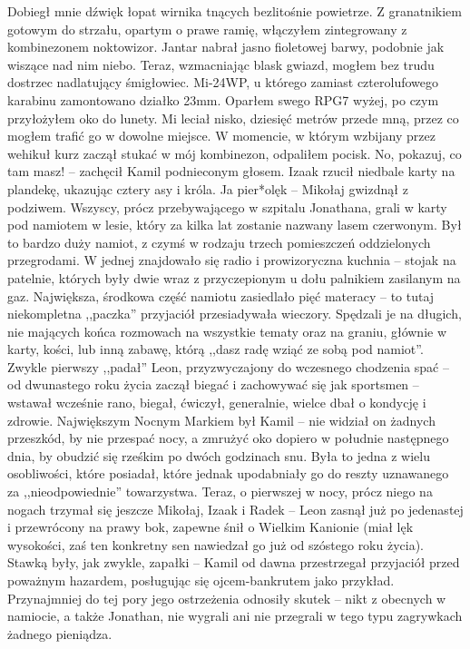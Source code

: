 \documentclass[../MAIN.tex]{subfiles}
\begin{document}
Dobiegł mnie dźwięk łopat wirnika tnących bezlitośnie powietrze. Z granatnikiem gotowym do strzału, opartym o prawe ramię, włączyłem zintegrowany z kombinezonem noktowizor. Jantar nabrał jasno fioletowej barwy, podobnie jak wiszące nad nim niebo. Teraz, wzmacniając blask gwiazd, mogłem bez trudu dostrzec nadlatujący śmigłowiec. Mi-24WP, u którego zamiast czterolufowego karabinu zamontowano działko 23mm. Oparłem swego RPG7 wyżej, po czym przyłożyłem oko do lunety. Mi leciał nisko, dziesięć metrów przede mną, przez co mogłem trafić go w dowolne miejsce. W momencie, w którym wzbijany przez wehikuł kurz zaczął stukać w mój kombinezon, odpaliłem pocisk.
% 
% 
\sx No, pokazuj, co tam masz! -- zachęcił Kamil podnieconym głosem.
\qd
Izaak rzucił niedbale karty na plandekę, ukazując cztery asy i króla.
\sx Ja pier*olę\3k -- Mikołaj gwizdnął z podziwem.
\qd
Wszyscy, prócz przebywającego w szpitalu Jonathana, grali w karty pod namiotem w lesie, który za kilka lat zostanie nazwany lasem czerwonym. Był to bardzo duży namiot, z czymś w rodzaju trzech pomieszczeń oddzielonych przegrodami. W jednej znajdowało się radio i prowizoryczna kuchnia -- stojak na patelnie, których były dwie wraz z przyczepionym u dołu palnikiem zasilanym na gaz. Największa, środkowa część namiotu zasiedlało pięć materacy -- to tutaj niekompletna ,,paczka'' przyjaciół przesiadywała wieczory. Spędzali je na długich, nie mających końca rozmowach na wszystkie tematy oraz na graniu, głównie w karty, kości, lub inną zabawę, którą ,,dasz radę wziąć ze sobą pod namiot''. Zwykle pierwszy ,,padał'' Leon, przyzwyczajony do wczesnego chodzenia spać -- od dwunastego roku życia zaczął biegać i zachowywać się jak sportsmen -- wstawał wcześnie rano, biegał, ćwiczył, generalnie, wielce dbał o kondycję i zdrowie. Największym Nocnym Markiem był Kamil -- nie widział on żadnych przeszkód, by nie przespać nocy, a
zmrużyć oko dopiero w południe następnego dnia, by obudzić się rześkim po dwóch godzinach snu. Była to jedna z wielu osobliwości, które posiadał, które jednak upodabniały go do reszty uznawanego za ,,nieodpowiednie'' towarzystwa. Teraz, o pierwszej w nocy, prócz niego na nogach trzymał się jeszcze Mikołaj, Izaak i Radek -- Leon zasnął już po jedenastej i przewrócony na prawy bok, zapewne śnił o Wielkim Kanionie (miał lęk wysokości, zaś ten konkretny sen nawiedzał go już od szóstego roku życia).\\
Stawką były, jak zwykle, zapałki -- Kamil od dawna przestrzegał przyjaciół przed poważnym hazardem, posługując się ojcem-bankrutem jako przykład. Przynajmniej do tej pory jego ostrzeżenia odnosiły skutek -- nikt z obecnych w namiocie, a także Jonathan, nie wygrali ani nie przegrali w tego typu zagrywkach żadnego pieniądza.\\
\end{document}
